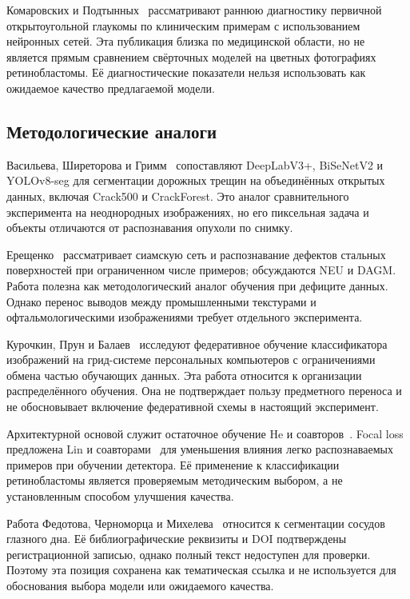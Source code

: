 \documentclass{misisarticle}
\begin{document}
Комаровских и Подтынных~\cite{komarovskikh2023} рассматривают раннюю диагностику первичной открытоугольной глаукомы по клиническим примерам с использованием нейронных сетей. Эта публикация близка по медицинской области, но не является прямым сравнением свёрточных моделей на цветных фотографиях ретинобластомы. Её диагностические показатели нельзя использовать как ожидаемое качество предлагаемой модели.

\subsection{Методологические аналоги}
Васильева, Ширеторова и Гримм~\cite{vasilieva2025} сопоставляют DeepLabV3+, BiSeNetV2 и YOLOv8-seg для сегментации дорожных трещин на объединённых открытых данных, включая Crack500 и CrackForest. Это аналог сравнительного эксперимента на неоднородных изображениях, но его пиксельная задача и объекты отличаются от распознавания опухоли по снимку.

Ерещенко~\cite{ereshchenko2023} рассматривает сиамскую сеть и распознавание дефектов стальных поверхностей при ограниченном числе примеров; обсуждаются NEU и DAGM. Работа полезна как методологический аналог обучения при дефиците данных. Однако перенос выводов между промышленными текстурами и офтальмологическими изображениями требует отдельного эксперимента.

Курочкин, Прун и Балаев~\cite{kurochkin2024} исследуют федеративное обучение классификатора изображений на грид-системе персональных компьютеров с ограничениями обмена частью обучающих данных. Эта работа относится к организации распределённого обучения. Она не подтверждает пользу предметного переноса и не обосновывает включение федеративной схемы в настоящий эксперимент.

Архитектурной основой служит остаточное обучение He и соавторов~\cite{resnet}. Focal loss предложена Lin и соавторами~\cite{focal} для уменьшения влияния легко распознаваемых примеров при обучении детектора. Её применение к классификации ретинобластомы является проверяемым методическим выбором, а не установленным способом улучшения качества.

Работа Федотова, Черноморца и Михелева~\cite{fedotov2018} относится к сегментации сосудов глазного дна. Её библиографические реквизиты и DOI подтверждены регистрационной записью, однако полный текст недоступен для проверки. Поэтому эта позиция сохранена как тематическая ссылка и не используется для обоснования выбора модели или ожидаемого качества.
\end{document}
